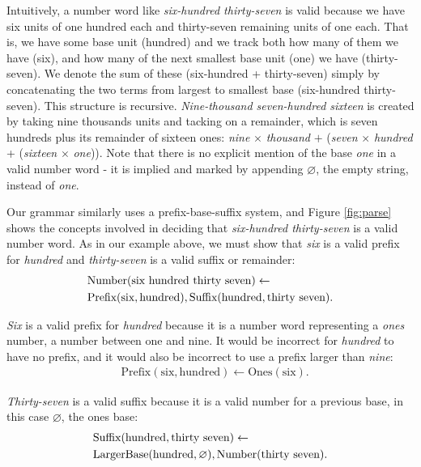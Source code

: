 \documentclass[10pt,letterpaper]{article}
\begin{document}
Intuitively, a number word like \emph{six-hundred thirty-seven} is
valid because we have six units of one hundred each and thirty-seven
remaining units of one each. That is, we have some base unit (hundred)
and we track both how many of them we have (six), and how many of the
next smallest base unit (one) we have (thirty-seven). We denote the
sum of these (six-hundred + thirty-seven) simply by concatenating the
two terms from largest to smallest base (six-hundred thirty-seven).
This structure is recursive. \emph{Nine-thousand seven-hundred
  sixteen} is created by taking nine thousands units and tacking on a
remainder, which is seven hundreds plus its remainder of sixteen ones:
\emph{nine} $\times$ \emph{thousand} $+$ (\emph{seven} $\times$
\emph{hundred} + (\emph{sixteen} $\times$ \emph{one})). Note that
there is no explicit mention of the base \emph{one} in a valid number
word - it is implied and marked by appending $\varnothing$, the empty
string, instead of \emph{one}.

Our grammar similarly uses a prefix-base-suffix system, and Figure
\ref{fig:parse} shows the concepts involved in deciding that
\emph{six-hundred thirty-seven} is a valid number word. As in our
example above, we must show that \emph{six} is a valid prefix for
\emph{hundred} and \emph{thirty-seven} is a valid suffix or remainder:
\begin{align}
  & \text{Number}(\text{six hundred thirty seven}) \leftarrow\\
  & \text{Prefix}(\text{six}, \text{hundred}), \text{Suffix}(\text{hundred}, \text{thirty seven}).\notag
\end{align}

\noindent\emph{Six} is a valid prefix for \emph{hundred} because it is
a number word representing a \emph{ones} number, a number between one
and nine. It would be incorrect for \emph{hundred} to have no prefix,
and it would also be incorrect to use a prefix larger than
\emph{nine}:
\begin{align}
  & \text{Prefix}(\text{six}, \text{hundred}) \leftarrow \text{Ones}(\text{six}).
\end{align}

\noindent\emph{Thirty-seven} is a valid suffix because it is a valid
number for a previous base, in this case $\varnothing$, the ones base:
\begin{align}
  & \text{Suffix}(\text{hundred}, \text{thirty seven}) \leftarrow\\
  & \text{LargerBase}(\text{hundred}, \varnothing), \text{Number}(\text{thirty seven}).\notag
\end{align}
\end{document}
